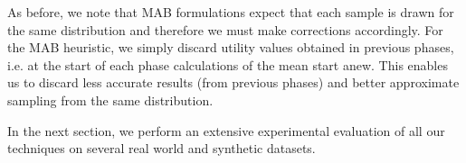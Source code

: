 As before, we note that MAB formulations expect that each sample is drawn for
the same distribution and therefore we must make corrections accordingly. 
For the MAB heuristic, we simply discard utility values obtained in previous
phases, i.e. at the start of each phase calculations of the mean start anew.
This enables us to discard less accurate results (from previous phases) and
better approximate sampling from the same distribution.

In the next section, we perform an extensive experimental evaluation of all our
techniques on several real world and synthetic datasets.
